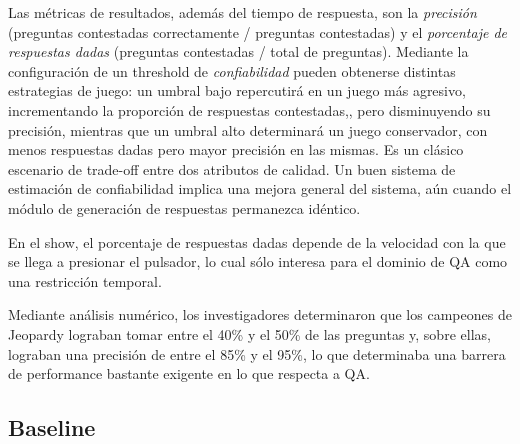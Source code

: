 Las m\'etricas de resultados, adem\'as del tiempo de respuesta, son la
\textit{precisi\'on} (preguntas contestadas correctamente / preguntas
contestadas) y el \textit{porcentaje de respuestas dadas }(preguntas
contestadas / total de preguntas). Mediante la configuraci\'on de un
threshold de \textit{confiabilidad} pueden obtenerse distintas
estrategias de juego: un umbral bajo repercutir\'a en un juego m\'as
agresivo, incrementando la proporci\'on de respuestas contestadas,,
pero disminuyendo su precisi\'on, mientras que un umbral alto
determinar\'a un juego conservador, con menos respuestas dadas pero
mayor precisi\'on en las mismas. Es un cl\'asico escenario de trade-off
entre dos atributos de calidad. Un buen sistema de estimaci\'on de
confiabilidad implica una mejora general del sistema, a\'un cuando el
m\'odulo de generaci\'on de respuestas permanezca id\'entico.


\bigskip

En el show, el porcentaje de respuestas dadas depende de la velocidad
con la que se llega a presionar el pulsador, lo cual s\'olo interesa
para el dominio de QA como una restricci\'on temporal. 


\bigskip

Mediante an\'alisis num\'erico, los investigadores determinaron que los
campeones de Jeopardy lograban tomar entre el 40\% y el 50\% de las
preguntas y, sobre ellas, lograban una precisi\'on de entre el 85\% y
el 95\%, lo que determinaba una barrera de performance bastante
exigente en lo que respecta a QA.


\bigskip

\subsection{Baseline}

